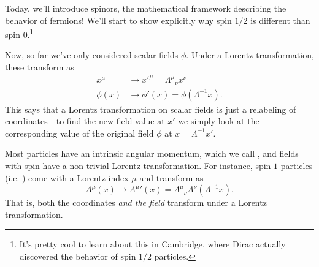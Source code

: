 Today, we'll introduce spinors, the mathematical framework describing the behavior of fermions! We'll start to show explicitly why spin $1/2$ is different than spin $0$.\footnote{It's pretty cool to learn about this in Cambridge, where Dirac actually discovered the behavior of spin $1/2$ particles.}

Now, so far we've only considered scalar fields $\phi$. Under a Lorentz transformation, these transform as
\begin{align*}
    x^\mu & \to {x'}^\mu = {\Lambda^\mu}_\nu x^\nu\\
    \phi(x) & \to \phi'(x)=\phi(\Lambda^{-1}x).
\end{align*}
This says that a Lorentz transformation on scalar fields is just a relabeling of coordinates---to find the new field value at $x'$ we simply look at the corresponding value of the original field $\phi$ at $x=\Lambda^{-1}x'$.

Most particles have an intrinsic angular momentum, which we call , and fields with spin have a non-trivial Lorentz transformation. For instance, spin $1$ particles (i.e. ) come with a Lorentz index $\mu$ and transform as
\begin{equation}\label{eq:four-vector_lorentz}
    A^\mu(x)\to {A^\mu}'(x)={\Lambda^\mu}_\nu A^\nu(\Lambda^{-1} x).
\end{equation}
That is, both the coordinates \emph{and the field} transform under a Lorentz transformation.

